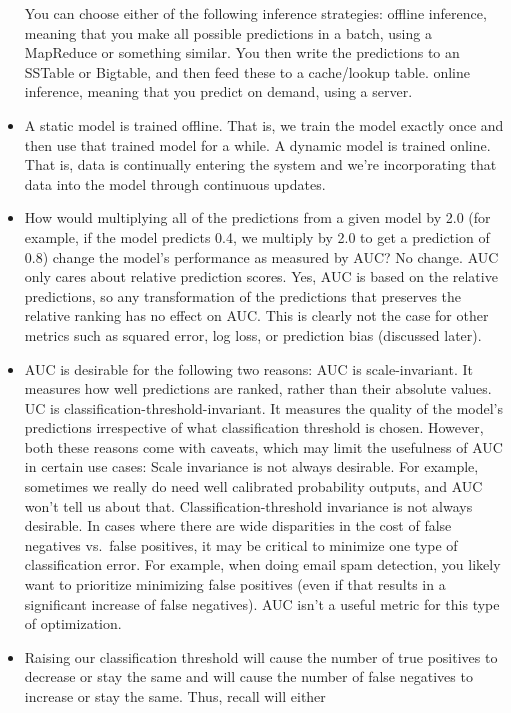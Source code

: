 \documentclass[]{book}
\begin{document}
\begin{itemize}
  You can choose either of the following inference strategies: offline
  inference, meaning that you make all possible predictions in a batch,
  using a MapReduce or something similar. You then write the predictions
  to an SSTable or Bigtable, and then feed these to a cache/lookup
  table. online inference, meaning that you predict on demand, using a
  server.
\item
  A static model is trained offline. That is, we train the model exactly
  once and then use that trained model for a while. A dynamic model is
  trained online. That is, data is continually entering the system and
  we're incorporating that data into the model through continuous
  updates.
\item
  How would multiplying all of the predictions from a given model by 2.0
  (for example, if the model predicts 0.4, we multiply by 2.0 to get a
  prediction of 0.8) change the model's performance as measured by AUC?
  No change. AUC only cares about relative prediction scores. Yes, AUC
  is based on the relative predictions, so any transformation of the
  predictions that preserves the relative ranking has no effect on AUC.
  This is clearly not the case for other metrics such as squared error,
  log loss, or prediction bias (discussed later).
\item
  AUC is desirable for the following two reasons: AUC is
  scale-invariant. It measures how well predictions are ranked, rather
  than their absolute values. UC is classification-threshold-invariant.
  It measures the quality of the model's predictions irrespective of
  what classification threshold is chosen. However, both these reasons
  come with caveats, which may limit the usefulness of AUC in certain
  use cases: Scale invariance is not always desirable. For example,
  sometimes we really do need well calibrated probability outputs, and
  AUC won't tell us about that. Classification-threshold invariance is
  not always desirable. In cases where there are wide disparities in the
  cost of false negatives vs.~false positives, it may be critical to
  minimize one type of classification error. For example, when doing
  email spam detection, you likely want to prioritize minimizing false
  positives (even if that results in a significant increase of false
  negatives). AUC isn't a useful metric for this type of optimization.
\item
  Raising our classification threshold will cause the number of true
  positives to decrease or stay the same and will cause the number of
  false negatives to increase or stay the same. Thus, recall will either

\end{itemize}
\end{document}
